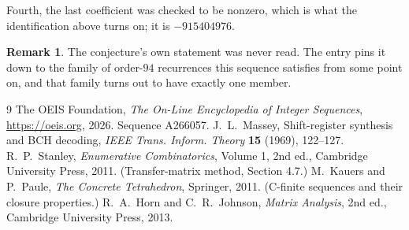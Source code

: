 \documentclass[11pt,a4paper]{article}
\theoremstyle{plain}
\theoremstyle{definition}
\newtheorem{remark}[theorem]{Remark}
\begin{document}
Fourth, the last coefficient was checked to be nonzero, which is what the identification above
turns on; it is $-915404976$.

\begin{remark}
The conjecture's own statement was never read. The entry pins it down to the family of
order-$94$ recurrences this sequence satisfies from some point on, and that family turns
out to have exactly one member.
\end{remark}

\begin{thebibliography}{9}
 The OEIS Foundation, \emph{The On-Line Encyclopedia of Integer
Sequences}, \url{https://oeis.org}, 2026. Sequence A266057.
 J.~L.~Massey, Shift-register synthesis and BCH decoding, \emph{IEEE
Trans. Inform. Theory} \textbf{15} (1969), 122--127.
 R.~P.~Stanley, \emph{Enumerative Combinatorics}, Volume 1, 2nd ed.,
Cambridge University Press, 2011. (Transfer-matrix method, Section 4.7.)
 M.~Kauers and P.~Paule, \emph{The Concrete Tetrahedron}, Springer, 2011.
(C-finite sequences and their closure properties.)
 R.~A.~Horn and C.~R.~Johnson, \emph{Matrix Analysis}, 2nd ed., Cambridge
University Press, 2013.
\end{thebibliography}
\end{document}
